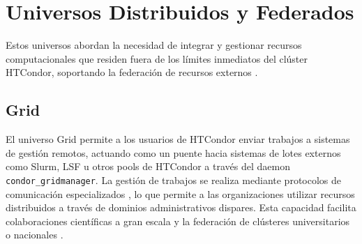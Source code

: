 \section{Universos Distribuidos y Federados}

Estos universos abordan la necesidad de integrar y gestionar recursos computacionales que residen fuera de los límites inmediatos del clúster HTCondor, soportando la federación de recursos externos  \citep{Padmanabhan2011}.

\subsection{Grid}

El universo Grid permite a los usuarios de HTCondor enviar trabajos a sistemas de gestión remotos, actuando como un puente hacia sistemas de lotes externos como Slurm, LSF u otros pools de HTCondor a través del daemon \texttt{condor\_gridmanager}. La gestión de trabajos se realiza mediante protocolos de comunicación especializados \citep{HTCondor-Grid-universe}, lo que permite a las organizaciones utilizar recursos distribuidos a través de dominios administrativos dispares. Esta capacidad facilita colaboraciones científicas a gran escala y la federación de clústeres universitarios o nacionales \citep{Padmanabhan2011}.
